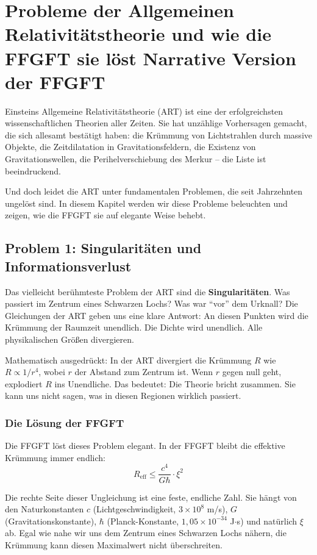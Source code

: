 \chapter{Probleme der Allgemeinen Relativitätstheorie  und wie die FFGFT sie löst  Narrative Version der FFGFT}



Einsteins Allgemeine Relativitätstheorie (ART) ist eine der erfolgreichsten wissenschaftlichen Theorien aller Zeiten. Sie hat unzählige Vorhersagen gemacht, die sich allesamt bestätigt haben: die Krümmung von Lichtstrahlen durch massive Objekte, die Zeitdilatation in Gravitationsfeldern, die Existenz von Gravitationswellen, die Perihelverschiebung des Merkur – die Liste ist beeindruckend.

Und doch leidet die ART unter fundamentalen Problemen, die seit Jahrzehnten ungelöst sind. In diesem Kapitel werden wir diese Probleme beleuchten und zeigen, wie die FFGFT sie auf elegante Weise behebt.

\section{Problem 1: Singularitäten und Informationsverlust}

Das vielleicht berühmteste Problem der ART sind die \textbf{Singularitäten}. Was passiert im Zentrum eines Schwarzen Lochs? Was war \enquote{vor} dem Urknall? Die Gleichungen der ART geben uns eine klare Antwort: An diesen Punkten wird die Krümmung der Raumzeit unendlich. Die Dichte wird unendlich. Alle physikalischen Größen divergieren.

Mathematisch ausgedrückt: In der ART divergiert die Krümmung $R$ wie $R \propto 1/r^4$, wobei $r$ der Abstand zum Zentrum ist. Wenn $r$ gegen null geht, explodiert $R$ ins Unendliche. Das bedeutet: Die Theorie bricht zusammen. Sie kann uns nicht sagen, was in diesen Regionen wirklich passiert.

\subsection{Die Lösung der FFGFT}

Die FFGFT löst dieses Problem elegant. In der FFGFT bleibt die effektive Krümmung immer endlich:
\begin{equation}
R_{\text{eff}} \leq \frac{c^4}{G \hbar} \cdot \xi^2
\end{equation}

Die rechte Seite dieser Ungleichung ist eine feste, endliche Zahl. Sie hängt von den Naturkonstanten $c$ (Lichtgeschwindigkeit, $3 \times 10^8$ m/s), $G$ (Gravitationskonstante), $\hbar$ (Planck-Konstante, $1,05 \times 10^{-34}$ J$\cdot$s) und natürlich $\xi$ ab. Egal wie nahe wir uns dem Zentrum eines Schwarzen Lochs nähern, die Krümmung kann diesen Maximalwert nicht überschreiten.

